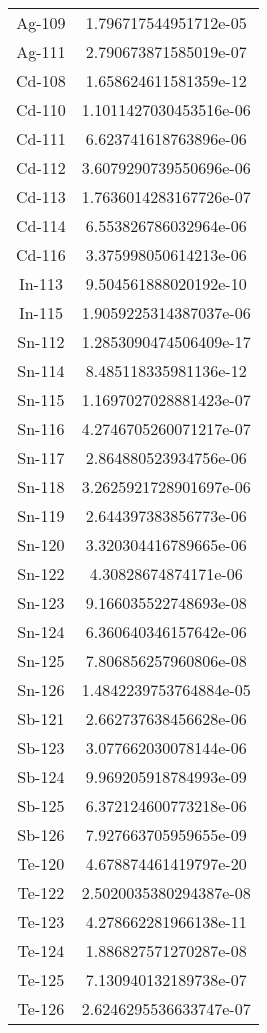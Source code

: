 \begin{table}[h!]
\begin{tabular}{|| c || c |}
Ag-109 & 1.796717544951712e-05 \\
Ag-111 & 2.790673871585019e-07 \\
Cd-108 & 1.658624611581359e-12 \\
Cd-110 & 1.1011427030453516e-06 \\
Cd-111 & 6.623741618763896e-06 \\
Cd-112 & 3.6079290739550696e-06 \\
Cd-113 & 1.7636014283167726e-07 \\
Cd-114 & 6.553826786032964e-06 \\
Cd-116 & 3.375998050614213e-06 \\
In-113 & 9.504561888020192e-10 \\
In-115 & 1.9059225314387037e-06 \\
Sn-112 & 1.2853090474506409e-17 \\
Sn-114 & 8.485118335981136e-12 \\
Sn-115 & 1.1697027028881423e-07 \\
Sn-116 & 4.2746705260071217e-07 \\
Sn-117 & 2.864880523934756e-06 \\
Sn-118 & 3.2625921728901697e-06 \\
Sn-119 & 2.644397383856773e-06 \\
Sn-120 & 3.320304416789665e-06 \\
Sn-122 & 4.30828674874171e-06 \\
Sn-123 & 9.166035522748693e-08 \\
Sn-124 & 6.360640346157642e-06 \\
Sn-125 & 7.806856257960806e-08 \\
Sn-126 & 1.4842239753764884e-05 \\
Sb-121 & 2.662737638456628e-06 \\
Sb-123 & 3.077662030078144e-06 \\
Sb-124 & 9.969205918784993e-09 \\
Sb-125 & 6.372124600773218e-06 \\
Sb-126 & 7.927663705959655e-09 \\
Te-120 & 4.678874461419797e-20 \\
Te-122 & 2.5020035380294387e-08 \\
Te-123 & 4.278662281966138e-11 \\
Te-124 & 1.886827571270287e-08 \\
Te-125 & 7.130940132189738e-07 \\
Te-126 & 2.6246295536633747e-07 \\

\end{tabular}
\end{table}
